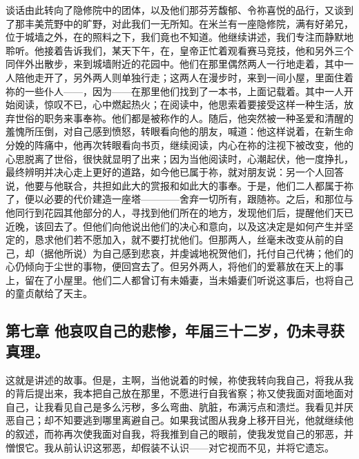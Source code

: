 谈话由此转向了隐修院中的团体，以及他们那芬芳馥郁、令祢喜悦的品行，又谈到了那丰美荒野中的旷野，对此我们一无所知。在米兰有一座隐修院，满有好弟兄，位于城墙之外，在的照料之下，我们竟也不知道。他继续讲述，我们专注而静默地聆听。他接着告诉我们，某天下午，在，皇帝正忙着观看赛马竞技，他和另外三个同伴外出散步，来到城墙附近的花园中。他们在那里偶然两人一行地走着，其中一人陪他走开了，另外两人则单独行走；这两人在漫步时，来到一间小屋，里面住着祢的一些仆人——，因为——在那里他们找到了一本书，上面记载着。其中一人开始阅读，惊叹不已，心中燃起热火；在阅读中，他思索着要接受这样一种生活，放弃世俗的职务来事奉祢。他们都是被称作的人。随后，他突然被一种圣爱和清醒的羞愧所压倒，对自己感到愤怒，转眼看向他的朋友，喊道：他这样说着，在新生命分娩的阵痛中，他再次转眼看向书页，继续阅读，内心在祢的注视下被改变，他的心思脱离了世俗，很快就显明了出来；因为当他阅读时，心潮起伏，他一度挣扎，最终辨明并决心走上更好的道路，如今他已属于祢，就对朋友说：另一个人回答说，他要与他联合，共担如此大的赏报和如此大的事奉。于是，他们二人都属于祢了，便以必要的代价建造一座塔————舍弃一切所有，跟随祢。之后，和那位与他同行到花园其他部分的人，寻找到他们所在的地方，发现他们后，提醒他们天已近晚，该回去了。但他们向他说出他们的决心和意向，以及这决定是如何产生并坚定的，恳求他们若不愿加入，就不要打扰他们。但那两人，丝毫未改变从前的自己，却（据他所说）为自己感到悲哀，并虔诚地祝贺他们，托付自己代祷；他们的心仍倾向于尘世的事物，便回宫去了。但另外两人，将他们的爱慕放在天上的事上，留在了小屋里。他们二人都曾订有未婚妻，当未婚妻们听说这事后，也将自己的童贞献给了天主。\par


\subsection{第七章 他哀叹自己的悲惨，年届三十二岁，仍未寻获真理。}

这就是讲述的故事。但是，主啊，当他说着的时候，祢使我转向我自己，将我从我的背后提出来，我本把自己放在那里，不愿进行自我省察；祢又使我面对面地面对自己，让我看见自己是多么污秽，多么弯曲、肮脏，布满污点和溃烂。我看见并厌恶自己；却不知要逃到哪里离避自己。如果我试图从我身上移开目光，他就继续他的叙述，而祢再次使我面对自我，将我推到自己的眼前，使我发觉自己的邪恶，并憎恨它。我从前认识这邪恶，却假装不认识——对它视而不见，并将它遗忘。\par

